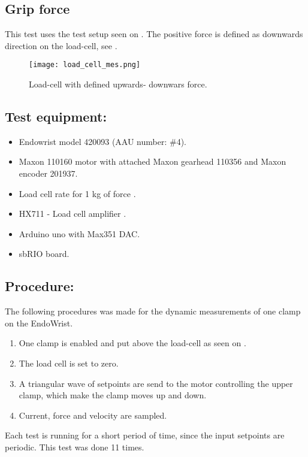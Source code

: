 \subsection{Grip force} %

This test uses the test setup seen on . The positive force is defined as downwards direction on the load-cell, see .

\begin{figure}[H]
	\centering
	\texttt{[image: load\_cell\_mes.png]}
	\caption{Load-cell with defined upwards- downwars force.}
	\label{fig:mes_up_down1}
\end{figure}


\subsection*{Test equipment:}
\begin{itemize}
\item Endowrist model 420093 (AAU number: \#4).
\item Maxon 110160 motor with attached Maxon gearhead 110356 and Maxon encoder 201937.
\item Load cell rate for 1 kg of force \cite{Load_cell_1kg}.
\item HX711 - Load cell amplifier \cite{HX711}.
\item Arduino uno with Max351 DAC.
\item sbRIO board.
\end{itemize}

\subsection*{Procedure:}
The following procedures was made for the dynamic measurements of one clamp on the EndoWrist.

\begin{enumerate}
\item One clamp is enabled and put above the load-cell as seen on .
\item The load cell is set to zero.
\item A triangular wave of setpoints are send to the motor controlling the upper clamp, which make the clamp moves up and down.
\item Current, force and velocity are sampled.
\end{enumerate}
Each test is running for a short period of time, since the input setpoints are periodic. This test was done 11 times.


